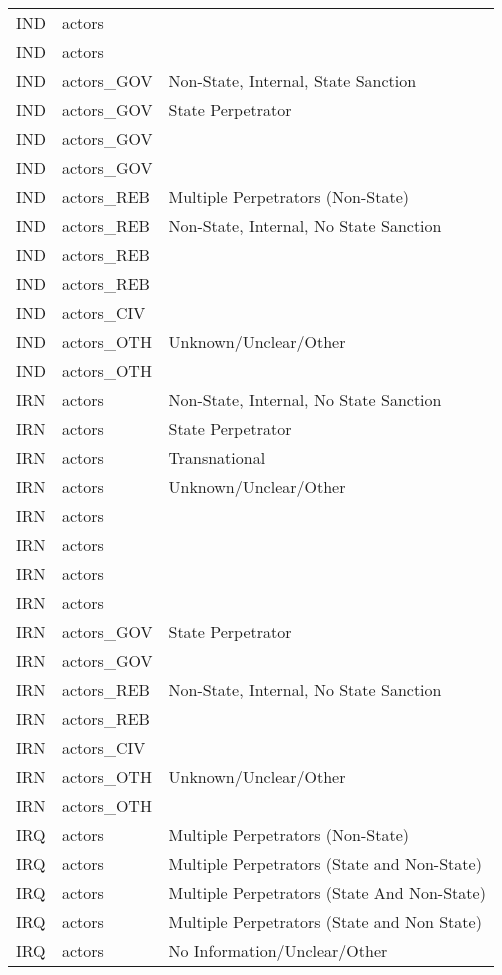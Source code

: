 \begin{table}[ht]
\begin{tabular}{lll}
  IND & actors &  \\ 
  IND & actors &  \\ 
  IND & actors\_GOV & Non-State, Internal, State Sanction \\ 
  IND & actors\_GOV & State Perpetrator \\ 
  IND & actors\_GOV &  \\ 
  IND & actors\_GOV &  \\ 
  IND & actors\_REB & Multiple Perpetrators (Non-State) \\ 
  IND & actors\_REB & Non-State, Internal, No State Sanction \\ 
  IND & actors\_REB &  \\ 
  IND & actors\_REB &  \\ 
  IND & actors\_CIV &  \\ 
  IND & actors\_OTH & Unknown/Unclear/Other \\ 
  IND & actors\_OTH &  \\ 
  IRN & actors & Non-State, Internal, No State Sanction \\ 
  IRN & actors & State Perpetrator \\ 
  IRN & actors & Transnational \\ 
  IRN & actors & Unknown/Unclear/Other \\ 
  IRN & actors &  \\ 
  IRN & actors &  \\ 
  IRN & actors &  \\ 
  IRN & actors &  \\ 
  IRN & actors\_GOV & State Perpetrator \\ 
  IRN & actors\_GOV &  \\ 
  IRN & actors\_REB & Non-State, Internal, No State Sanction \\ 
  IRN & actors\_REB &  \\ 
  IRN & actors\_CIV &  \\ 
  IRN & actors\_OTH & Unknown/Unclear/Other \\ 
  IRN & actors\_OTH &  \\ 
  IRQ & actors & Multiple Perpetrators (Non-State) \\ 
  IRQ & actors & Multiple Perpetrators (State and Non-State) \\ 
  IRQ & actors & Multiple Perpetrators (State And Non-State) \\ 
  IRQ & actors & Multiple Perpetrators (State and Non State) \\ 
  IRQ & actors & No Information/Unclear/Other \\ 

\end{tabular}
\end{table}

